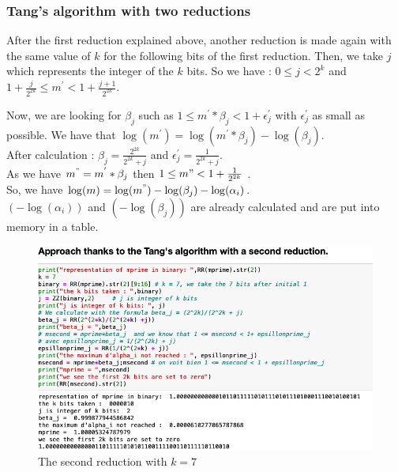 \subsubsection{\textbf{Tang}'s algorithm with two reductions}

After the first reduction explained above, another reduction is made again with the same value of $k$ for the following bits of the first reduction. Then, we  take $j$ which represents the integer of the $k$ bits. So we have : $0 \le j < 2^k$ and $1+\frac{j}{2^{2k}} \le m^{'} < 1 +\frac{j+1}{2^{2k}}$.

Now, we are looking for $\beta_j$ such as $1 \le m^{'} * \beta_j < 1+\epsilon^{'}_j$ with $\epsilon^{'}_j$ as small as possible. We have that $\log(m^{'})= \log(m^{'}*\beta_j) - \log(\beta_j)$.\\
After calculation : $\beta_j = \frac{2^{2k}}{2^{2k}+j}$ and $\epsilon^{'}_j = \frac{1}{2^{2k}+j}$. \\
As we have $m^{"} = m^{'}*\beta_j $ then $1 \le m{"} < 1 + \frac{1}{2^{2k}}$ .\\
So, we have $\log(m) = \log(m^{"}) - \log(\beta_j) - \log(\alpha_i)$.\\ 
$(-\log(\alpha_i))$  and  $(-\log(\beta_j))$ are already calculated and are put into memory in a table.
\begin{figure}[H]
    \centering
    \includegraphics[width=\textwidth]{images/approche_de_Tang/Tang_2.png}
    \caption{The second reduction with $k = 7$}
\end{figure}

